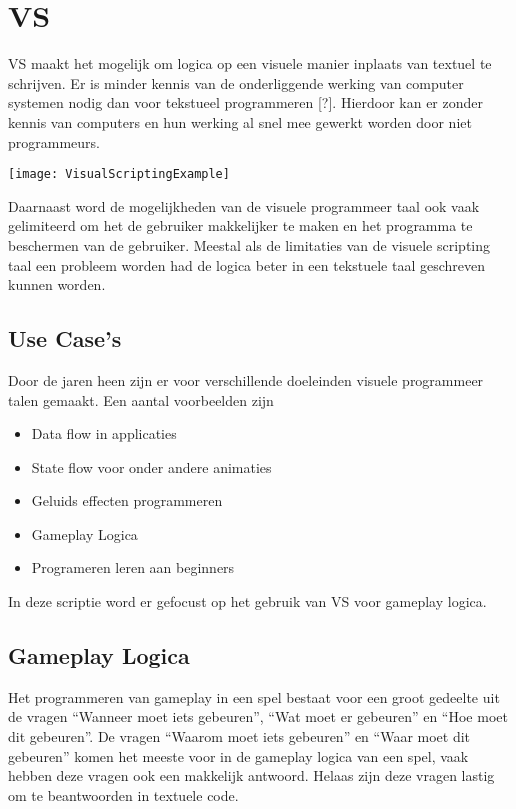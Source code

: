 \lstset {language=C++}

\chapter{VS}

VS maakt het mogelijk om logica op een visuele manier inplaats van textuel te schrijven. Er is minder kennis van de onderliggende werking van computer systemen nodig dan voor tekstueel programmeren [?]. Hierdoor kan er zonder kennis van computers en hun werking al snel mee gewerkt worden door niet programmeurs. 

\texttt{[image: VisualScriptingExample]}

Daarnaast word de mogelijkheden van de visuele programmeer taal ook vaak gelimiteerd om het de gebruiker makkelijker te maken en het programma te beschermen van de gebruiker. Meestal als de limitaties van de visuele scripting taal een probleem worden had de logica beter in een tekstuele taal geschreven kunnen worden.

\section{Use Case's}
Door de jaren heen zijn er voor verschillende doeleinden visuele programmeer talen gemaakt. 
Een aantal voorbeelden zijn

\begin{itemize}  
\item Data flow in applicaties 
\item State flow voor onder andere animaties 
\item Geluids effecten programmeren
\item Gameplay Logica 
\item Programeren leren aan beginners 
\end{itemize}

In deze scriptie word er gefocust op het gebruik van VS voor gameplay logica.

\section{Gameplay Logica}
Het programmeren van gameplay in een spel bestaat voor een groot gedeelte uit de vragen “Wanneer moet iets gebeuren”, “Wat moet er gebeuren” en “Hoe moet dit gebeuren”.
De vragen “Waarom moet iets gebeuren” en “Waar moet dit gebeuren” komen het meeste voor in de gameplay logica van een spel, vaak hebben deze vragen ook een makkelijk antwoord. Helaas zijn deze vragen lastig om te beantwoorden in textuele code.

